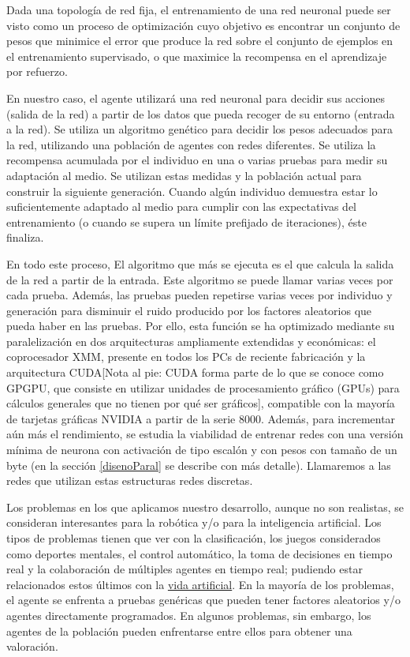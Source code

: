\documentclass[a4paper,11pt]{article}
\begin{document}
 Dada una topolog\'ia de red fija, el entrenamiento de una red neuronal puede ser visto como un proceso de optimizaci\'on cuyo objetivo es encontrar un conjunto de pesos que minimice el error que produce la red sobre el conjunto de ejemplos en el entrenamiento supervisado, o que maximice la recompensa en el aprendizaje por refuerzo.

 En nuestro caso, el agente utilizar\'a una red neuronal para decidir sus acciones (salida de la red) a partir de los datos que pueda recoger de su entorno (entrada a la red). Se utiliza un algoritmo gen\'etico para decidir los pesos adecuados para la red, utilizando una poblaci\'on de agentes con redes diferentes. Se utiliza la recompensa acumulada por el individuo en una o varias pruebas para medir su adaptaci\'on al medio. Se utilizan estas medidas y la poblaci\'on actual para construir la siguiente generaci\'on. Cuando alg\'un individuo demuestra estar lo suficientemente adaptado al medio para cumplir con las expectativas del entrenamiento (o cuando se supera un l\'imite prefijado de iteraciones), \'este finaliza.

 En todo este proceso, El algoritmo que m\'as se ejecuta es el que calcula la salida de la red a partir de la entrada. Este algoritmo se puede llamar varias veces por cada prueba. Adem\'as, las pruebas pueden repetirse varias veces por individuo y generaci\'on para disminuir el ruido producido por los factores aleatorios que pueda haber en las pruebas. Por ello, esta funci\'on se ha optimizado mediante su paralelizaci\'on en dos arquitecturas ampliamente extendidas y econ\'omicas: el coprocesador XMM, presente en todos los PCs de reciente fabricaci\'on y la arquitectura CUDA[Nota al pie: CUDA forma parte de lo que se conoce como GPGPU, que consiste en utilizar unidades de procesamiento gr\'afico (GPUs) para c\'alculos generales que no tienen por qu\'e ser gr\'aficos], compatible con la mayor\'ia de tarjetas gr\'aficas NVIDIA a partir de la serie 8000. Adem\'as, para incrementar a\'un m\'as el rendimiento, se estudia la viabilidad de entrenar redes con una versi\'on m\'inima de neurona con activaci\'on de tipo escal\'on y con pesos con tama\~no de un byte (en la secci\'on \ref{disenoParal} se describe con m\'as detalle). Llamaremos a las redes que utilizan estas estructuras redes discretas.

 Los problemas en los que aplicamos nuestro desarrollo, aunque no son realistas, se consideran interesantes para la rob\'otica y/o para la inteligencia artificial. Los tipos de problemas tienen que ver con la clasificaci\'on, los juegos considerados como deportes mentales, el control autom\'atico, la toma de decisiones en tiempo real y la colaboraci\'on de m\'ultiples agentes en tiempo real; pudiendo estar relacionados estos \'ultimos con la \href{http://es.wikipedia.org/wiki/Vida_artificial}{vida artificial}. En la mayor\'ia de los problemas, el agente se enfrenta a pruebas gen\'ericas que pueden tener factores aleatorios y/o agentes directamente programados. En algunos problemas, sin embargo, los agentes de la poblaci\'on pueden enfrentarse entre ellos para obtener una valoraci\'on.
\end{document}
